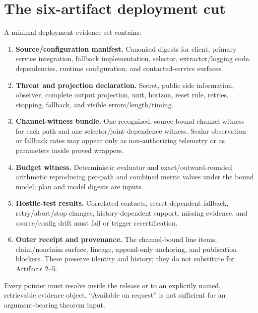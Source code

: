 \documentclass[11pt]{article}
\begin{document}
\section{The six-artifact deployment cut}\label{sec:artifacts}
A minimal deployment evidence set contains:
\begin{enumerate}[leftmargin=*]
\item \textbf{Source/configuration manifest.} Canonical digests for client, primary service integration, fallback implementation, selector, extractor/logging code, dependencies, runtime configuration, and contacted-service surfaces.
\item \textbf{Threat and projection declaration.} Secret, public side information, observer, complete output projection, unit, horizon, reset rule, retries, stopping, fallback, and visible errors/length/timing.\cite{series:threatwindows}
\item \textbf{Channel-witness bundle.} One recognized, source-bound channel witness for each path and one selector/joint-dependence witness. Scalar observation or fallback rates may appear only as non-authorizing telemetry or as parameters inside proved wrappers.
\item \textbf{Budget witness.} Deterministic evaluator and exact/outward-rounded arithmetic reproducing per-path and combined metric values under the bound model; plan and model digests are inputs.\cite{series:bossfightdial}
\item \textbf{Hostile-test results.} Correlated contacts, secret-dependent fallback, retry/abort/stop changes, history-dependent support, missing evidence, and source/config drift must fail or trigger recertification.
\item \textbf{Outer receipt and provenance.} The channel-bound line items, claim/nonclaim surface, lineage, append-only anchoring, and publication blockers. These preserve identity and history; they do not substitute for Artifacts 2--5.\cite{series:abomoinl,series:releaseledger,series:transparency}
\end{enumerate}

Every pointer must resolve inside the release or to an explicitly named, retrievable evidence object. ``Available on request'' is not sufficient for an argument-bearing theorem input.
\end{document}
